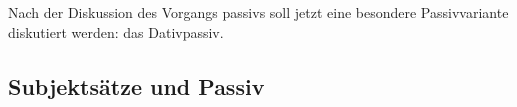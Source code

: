 



Nach der Diskussion des Vorgangs%
passivs soll jetzt eine besondere
Passivvariante diskutiert werden: das Dativpassiv.
\largerpage

\subsection{Subjektsätze und Passiv}



